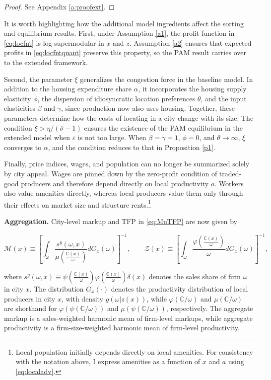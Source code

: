 \begin{proof}
	See Appendix \ref{a:proofext}.
\end{proof}

It is worth highlighting how the additional model ingredients affect the sorting and equilibrium results. First, under Assumption \ref{a1}, the profit function in \eqref{eq:locfnt} is log-supermodular in $x$ and $z$. Assumption \ref{a2} ensures that expected profits in \eqref{eq:locfntquant} preserve this property, so the PAM result carries over to the extended framework.

Second, the parameter $\xi$ generalizes the congestion force in the baseline model. In addition to the housing expenditure share $\alpha$, it incorporates the housing supply elasticity $\phi$, the dispersion of idiosyncratic location preferences $\theta$, and the input elasticities $\beta$ and $\gamma$, since production now also uses housing. Together, these parameters determine how the costs of locating in a city change with its size. The condition $\xi>\eta/(\overline{\sigma}-1)$ ensures the existence of the PAM equilibrium in the extended model when $\varepsilon$ is not too large. When $\beta=\gamma=1$, $\phi=0$, and $\theta\to\infty$, $\xi$ converges to $\alpha$, and the condition reduces to that in Proposition \ref{p1}.

Finally, price indices, wages, and population can no longer be summarized solely by city appeal. Wages are pinned down by the zero-profit condition of traded-good producers and therefore depend directly on local productivity $a$. Workers also value amenities directly, whereas local producers value them only through their effects on market size and structure rents.\footnote{Local population initially depends directly on local amenities. For consistency with the notation above, I express amenities as a function of $x$ and $a$ using \eqref{eq:localadv}.}

\textbf{Aggregation.} City-level markup and TFP in \eqref{eq:MuTFP} are now given by

\begin{equation}\label{eq:aggobjects}
\mathcal{M}(x) \equiv \left[\int_\omega \frac{s^y(\omega,x)}{\mu\left(\frac{\mathbb{C}(x)}{\omega}\right)} dG_x(\omega)\right]^{-1},
\qquad
\mathcal{Z}(x) \equiv \left[\int_\omega \frac{\varphi\left(\frac{\mathbb{C}(x)}{\omega}\right)}{\omega} dG_x(\omega)\right]^{-1},
\end{equation}

where $s^y(\omega,x) \equiv \psi\left(\frac{\mathbb{C}(x)}{\omega}\right)\varphi\left(\frac{\mathbb{C}(x)}{\omega}\right)\overline{\delta}(x)$ denotes the sales share of firm $\omega$ in city $x$. The distribution $G_x(\cdot)$ denotes the productivity distribution of local producers in city $x$, with density $g(\omega| z(x))$, while $\varphi(\mathbb{C}/\omega)$ and $\mu(\mathbb{C}/\omega)$ are shorthand for $\varphi(\psi(\mathbb{C}/\omega))$ and $\mu(\psi(\mathbb{C}/\omega))$, respectively. The aggregate markup is a sales-weighted harmonic mean of firm-level markups, while aggregate productivity is a firm-size-weighted harmonic mean of firm-level productivity.

